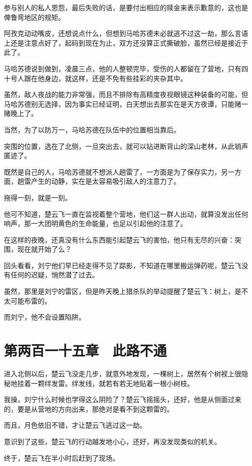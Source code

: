 参与别人的私人恩怨，最后失败的话，是要付出相应的赎金来表示歉意的，这也是俾鲁弯地区的规矩。

阿孜克动动嘴皮，还想说点什么，但想到马哈苏德未必就逃不过这一劫，那么言语上还是注意点好了，起码到现在为止，双方还没算正式撕破脸，虽然已经是接近于此了。

马哈苏德说到做到，凌晨三点，他的人整顿完毕，受伤的人都留在了营地，只有四十号人跟在他身边，就这样，还是不免有些挂彩的夹杂其中。

虽然，敌人夜战的能力非常强，而且不排除有高精度夜视眼镜这种装备的可能，但马哈苏德别无选择，因为事实已经证明，白天想出去那实在是天方夜谭，只能赌一赌晚上了。

当然，为了以防万一，马哈苏德在队伍中的位置相当靠后。

突围的位置，选在了北侧，一旦突出去，就可以钻进断背山的深山老林，从此销声匿迹了。

既然是自己的人，马哈苏德就不想派人趟雷了，一方面是为了保存实力，另一方面，趟雷产生的动静，实在是太容易吸引敌人的注意力了。

拖得一刻，就是一刻。

他可不知道，楚云飞一直在监视着整个营地，他们这一群人出动，就算没发出任何响声，那一大团明黄色的生命能量，也足以引起他的注意了。

在这样的夜晚，还真没有什么东西能引起楚云飞的害怕，他只有无尽的兴奋：突围，现在就开始了么？

回头看看，刘宁他们早已经走得不见了踪影，不知道在哪里搬运弹药呢，楚云飞没有任何的迟疑，悄然潜了过去。

虽然，那里是刘宁的雷区，但是昨天晚上猎杀队的举动提醒了楚云飞：树上，是不太可能布雷的。

而刘宁，他不会设置陷阱。

\section{第两百一十五章　此路不通}

进入北侧以后，楚云飞没走几步，就意外地发现，一棵树上，居然有个树衩上很隐秘地挂着一颗绊发雷。绊发线，就若有若无地贴着一根小树枝。

我操，刘宁什么时候也学得这么阴险了？楚云飞摇摇头，还好，他是从侧面过来的，要是从营地的方向出来，那绝对是看不到这颗雷的。

而且，月色依旧不错，才让楚云飞逃过这一劫。

意识到了这些，楚云飞的行动越发地小心，还好，再没发现类似的机关。

终于，楚云飞在半小时后赶到了现场。

